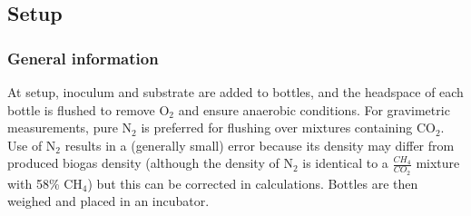 \documentclass[]{article}
\begin{document}
\subsection{Setup}

\subsubsection*{General information}

At setup, inoculum and substrate are added to bottles, and the headspace of each bottle is flushed to remove O$_2$ and ensure anaerobic conditions. For gravimetric measurements, pure N$_2$ is preferred for flushing over mixtures containing CO$_2$. Use of N$_2$ results in a (generally small) error because its density may differ from produced biogas density (although the density of N$_2$ is identical to a $\frac{CH_4}{CO_2}$ mixture with 58\% CH$_4$) but this can be corrected in calculations. Bottles are then weighed and placed in an incubator.
\end{document}
